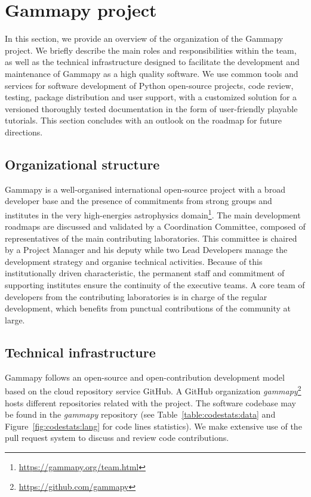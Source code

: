 \section{Gammapy project}
\label{sec:gammapy-project}

In this section, we provide an overview of the organization of the Gammapy project. We briefly describe the main roles and responsibilities within the team, as well as the technical infrastructure designed to facilitate the development and maintenance of Gammapy as a high quality software. We use common tools and services for software development of Python open-source projects, code review, testing, package distribution and user support, with a customized solution for a versioned thoroughly tested documentation in the form of user-friendly playable tutorials. This section concludes with an outlook on the roadmap for future directions.

\subsection{Organizational structure}
\label{ssec:organizational-structure}

Gammapy is a well-organised international open-source project with a broad developer base and the presence of commitments from strong groups and institutes in the very high-energies astrophysics domain\footnote{\url{https://gammapy.org/team.html}}. The main development roadmaps are discussed and validated by a Coordination Committee, composed of representatives of the main contributing laboratories. This committee is chaired by a Project Manager and his deputy while two Lead Developers manage the development strategy and organise technical activities. Because of this institutionally driven characteristic, the permanent staff and commitment of supporting institutes ensure the continuity of the executive teams. A core team of developers from the contributing laboratories is in charge of the regular development, which benefits from punctual contributions of the community at large.

\subsection{Technical infrastructure}
\label{ssec:technical-infrastructure}

Gammapy follows an open-source and open-contribution development model based on the cloud repository service GitHub. A GitHub organization \textit{gammapy}\footnote{\url{https://github.com/gammapy}} hosts different repositories related with the project. The software codebase may be found in the \textit{gammapy} repository (see Table~\ref{table:codestats:data} and Figure~\ref{fig:codestats:lang} for code lines statistics). We make extensive use of the pull request system to discuss and review code contributions.

